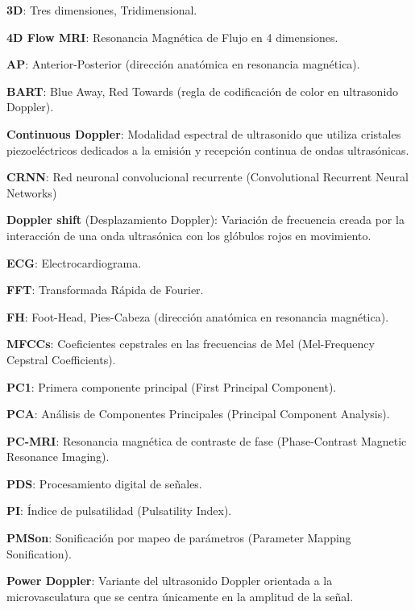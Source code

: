 
{\setlength{\parskip}{0cm} %
\textbf{3D}: Tres dimensiones, Tridimensional.

\textbf{4D Flow MRI}: Resonancia Magnética de Flujo en 4 dimensiones.

\textbf{AP}: Anterior-Posterior (dirección anatómica en resonancia magnética).

\textbf{BART}: Blue Away, Red Towards (regla de codificación de color en ultrasonido Doppler).

\textbf{Continuous Doppler}: Modalidad espectral de ultrasonido que utiliza cristales piezoeléctricos dedicados a la emisión y recepción continua de ondas ultrasónicas.

\textbf{CRNN}: Red neuronal convolucional recurrente (Convolutional Recurrent Neural Networks) 

\textbf{Doppler shift} (Desplazamiento Doppler): Variación de frecuencia creada por la interacción de una onda ultrasónica con los glóbulos rojos en movimiento.

\textbf{ECG}: Electrocardiograma.

\textbf{FFT}: Transformada Rápida de Fourier.

\textbf{FH}: Foot-Head, Pies-Cabeza (dirección anatómica en resonancia magnética).

\textbf{MFCCs}: Coeficientes cepstrales en las frecuencias de Mel (Mel-Frequency Cepstral Coefficients).


\textbf{PC1}: Primera componente principal (First Principal Component).

\textbf{PCA}: Análisis de Componentes Principales (Principal Component Analysis).

\textbf{PC-MRI}: Resonancia magnética de contraste de fase (Phase-Contrast Magnetic Resonance Imaging).

\textbf{PDS}: Procesamiento digital de señales.

\textbf{PI}: Índice de pulsatilidad (Pulsatility Index).

\textbf{PMSon}: Sonificación por mapeo de parámetros (Parameter Mapping Sonification).

\textbf{Power Doppler}: Variante del ultrasonido Doppler orientada a la microvasculatura que se centra únicamente en la amplitud de la señal.

}
